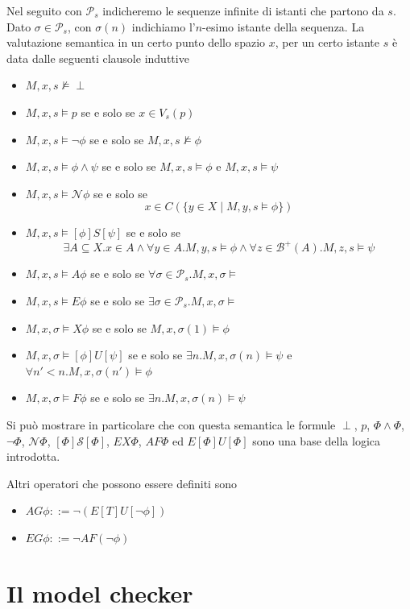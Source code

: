 \documentclass[a4paper,11pt]{article}
\newcommand{\Near}{\mathcal{N}}
\newcommand{\Surr}{\mathcal{S}}
\renewcommand{\(}{\left(}
\renewcommand{\)}{\right)}
\newcommand{\<}{\textlangle}
\renewcommand{\>}{\textrangle}
\begin{document}
Nel seguito con $\mathcal{P}_s$ indicheremo le sequenze infinite di istanti che partono da $s$. Dato $\sigma \in \mathcal{P}_s$, con $\sigma(n)$ indichiamo l'$n$-esimo istante della sequenza. La valutazione semantica in un certo punto dello spazio $x$, per un certo istante $s$ è data dalle seguenti clausole induttive
\begin{itemize}
 \item $M,x,s \not \vDash \perp$
 \item $M,x,s \vDash p$ se e solo se $x\in V_s(p)$
 \item $M,x,s \vDash \neg \phi$ se e solo se $M,x,s \not\vDash \phi$
 \item $M,x,s \vDash \phi \wedge \psi$ se e solo se $M,x,s \vDash \phi$ e $M,x,s \vDash \psi$
 \item $M,x,s \vDash \Near \phi$ se e solo se \[ x\in C \( \{ y\in X \mid M,y,s\vDash \phi \} \) \]
 \item $M,x,s \vDash [\phi] S [\psi]$ se e solo se \[ \exists A \subseteq X . x\in A \wedge \forall y \in A . M,y,s\vDash \phi \wedge \forall z \in \mathcal{B}^+(A).M,z,s\vDash \psi \]
 \item $M,x,s \vDash A\phi $ se e solo se $\forall \sigma \in \mathcal{P}_s . M,x,\sigma \vDash $
 \item $M,x,s \vDash E\phi $ se e solo se $\exists \sigma \in \mathcal{P}_s . M,x,\sigma \vDash $
 \item $M,x,\sigma \vDash X\phi$ se e solo se $M,x,\sigma(1) \vDash \phi$
 \item $M,x,\sigma \vDash [\phi] U [\psi]$ se e solo se $\exists n . M,x,\sigma(n) \vDash \psi$ e $\forall n' < n . M,x,\sigma(n') \vDash \phi$
 \item $M,x,\sigma \vDash F \phi$ se e solo se $\exists n . M,x,\sigma(n) \vDash \psi$
\end{itemize}

Si può mostrare in particolare che con questa semantica le formule $\perp$, $p$, $\Phi \wedge \Phi$, $\neg \Phi$, $\Near \Phi$, $[\Phi] \Surr [\Phi]$, $EX \Phi$, $AF \Phi$ ed $E[\Phi]U[\Phi]$ sono una base della logica introdotta.

Altri operatori che possono essere definiti sono
\begin{itemize}
 \item $AG \phi ::= \neg ( E [T ] U [\neg \phi ] )$
 \item $EG \phi ::= \neg AF (\neg \phi) $
\end{itemize}


\section{Il model checker}
\end{document}
